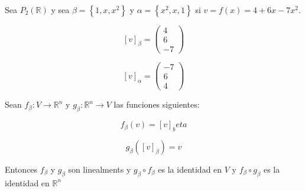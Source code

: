 \documentclass{report}
\begin{document}
    \begin{Example}
        Sea $P_2(\mathbb{R})$ y sea $\beta = \left\{ 1, x, x^2 \right\}$ y $\alpha = \left\{ x^2, x, 1 \right\}$ si $v = f(x) = 4 + 6x -7x^2$.

        $$[v]_\beta = \begin{pmatrix}
            4\\6\\-7
        \end{pmatrix}$$

        $$[v]_\alpha = \begin{pmatrix}
            -7\\6\\4
        \end{pmatrix}$$
    \end{Example}
    
    \begin{thBox}
        Sean $f_\beta: V \to \mathbb{R}^n$ y $g_\beta:\mathbb{R}^n \to V$ las funciones siguientes:
        
        $$f_\beta(v) = [v]_beta$$
        
        $$g_\beta([v]_\beta) = v$$
        
        Entonces $f_\beta$ y $g_\beta$ son linealments y $g_\beta \circ f_\beta$ es la identidad en $V$ y $f_\beta \circ g_\beta$ es la identidad en $\mathbb{R}^n$
    \end{thBox}
    
\end{document}
